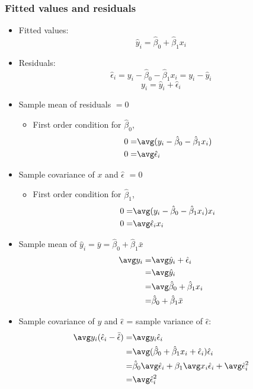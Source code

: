 \begin{frame}[allowframebreaks]
  \frametitle{Fitted values and residuals}
  \begin{itemize}
  \item \alert{Fitted values}: 
    \[ \hat{y}_i = \hat{\beta}_0 +
    \hat{\beta}_1 x_i \]
  \item \alert{Residuals}: 
    \[\hat{\epsilon}_i = y_i - \hat{\beta}_0 -
    \hat{\beta}_1 x_i = y_i  - \hat{y}_i \] 
    \[ y_i = \hat{y}_i + \hat{\epsilon}_i \]
  \item Sample mean of residuals $=0$
    \begin{itemize}
    \item First order condition for $\hat{\beta}_0$,
      \begin{align*}
        0 = &\avg (y_i - \hat{\beta}_0 - \hat{\beta}_1
        x_i) \\ 
        0 = & \avg \hat{\epsilon}_i 
      \end{align*}
    \end{itemize}
  \item Sample covariance of $x$ and $\hat{\epsilon}$ $= 0$
    \begin{itemize}
    \item First order condition for $\hat{\beta}_1$,
      \begin{align*}
        0 = &\avg (y_i - \hat{\beta}_0 - \hat{\beta}_1
        x_i)x_i \\ 
        0 = & \avg \hat{\epsilon}_i x_i
      \end{align*}
    \end{itemize}
  \item Sample mean of $\hat{y}_i = \bar{y} = \hat{\beta}_0 +
    \hat{\beta}_1 \bar{x}$ 
    \begin{align*}
      \avg y_i = & \avg \hat{y}_i + \hat{\epsilon}_i \\
      = & \avg \hat{y}_i \\
      = & \avg  \hat{\beta}_0 + \hat{\beta}_1 x_i \\
      = & \hat{\beta}_0 + \hat{\beta}_1 \bar{x}
    \end{align*}
  \item Sample covariance of $y$ and $\hat{\epsilon}$ = sample
    variance of $\hat{\epsilon}$:
    \begin{align*}
      \avg y_i (\hat{\epsilon}_i - \bar{\hat{\epsilon}}) = & \avg y_i
      \hat{\epsilon}_i \\
      = & \avg (\hat{\beta}_0 + \hat{\beta}_1 x_i +
      \hat{\epsilon}_i)\hat{\epsilon}_i \\
      = & \hat{\beta}_0 \avg \hat{\epsilon}_i + \beta_1 \avg x_i
      \hat{\epsilon}_i + \avg \hat{\epsilon}_i^2 \\
      = & \avg \hat{\epsilon}_i^2 
    \end{align*}
  \end{itemize}
\end{frame}

